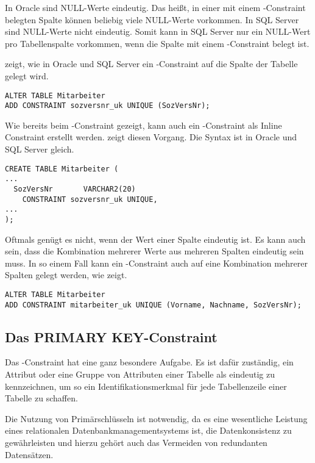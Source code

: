 \begin{merke}
    In Oracle sind NULL-Werte eindeutig. Das heißt, in einer mit einem
    \UNIQUE-Constraint belegten Spalte können beliebig viele NULL-Werte
    vorkommen. In SQL Server sind NULL-Werte nicht eindeutig. Somit kann
    in SQL Server nur ein NULL-Wert pro Tabellenspalte vorkommen, wenn
    die Spalte mit einem \UNIQUE-Constraint belegt ist.
\end{merke}
 zeigt, wie in Oracle und SQL Server ein
\UNIQUE-Constraint auf die Spalte  der Tabelle
 gelegt wird.
\clearpage
\begin{lstlisting}[language=oracle_sql,caption={Ein UNIQUE-Constraint anlegen},label=sql09_10]
ALTER TABLE Mitarbeiter
ADD CONSTRAINT sozversnr_uk UNIQUE (SozVersNr);
        \end{lstlisting}
Wie bereits beim \CHECK-Constraint gezeigt, kann auch ein \UNIQUE-Constraint als Inline Constraint erstellt werden.  zeigt diesen Vorgang. Die Syntax ist in Oracle und SQL Server gleich.
\begin{lstlisting}[language=oracle_sql,caption={Ein \UNIQUE-Constraint als Inline Constraint anlegen},label=sql09_11]
CREATE TABLE Mitarbeiter (
...
  SozVersNr       VARCHAR2(20)
    CONSTRAINT sozversnr_uk UNIQUE,
...
);
        \end{lstlisting}
Oftmals genügt es nicht, wenn der Wert einer Spalte eindeutig ist. Es kann auch sein, dass die Kombination mehrerer Werte aus mehreren Spalten eindeutig sein muss. In so einem Fall kann ein \UNIQUE-Constraint auch auf eine Kombination mehrerer Spalten gelegt werden, wie  zeigt.
\begin{lstlisting}[language=oracle_sql,caption={Ein kombiniertes UNIQUE-Constraint anlegen},label=sql09_12]
ALTER TABLE Mitarbeiter
ADD CONSTRAINT mitarbeiter_uk UNIQUE (Vorname, Nachname, SozVersNr);
        \end{lstlisting}
\subsection{Das PRIMARY KEY-Constraint}
Das \PRIMARYKEY-Constraint hat eine ganz besondere Aufgabe. Es ist dafür zuständig, ein Attribut oder eine Gruppe von Attributen einer Tabelle als eindeutig zu kennzeichnen, um so ein Identifikationsmerkmal für jede Tabellenzeile einer Tabelle zu schaffen.

Die Nutzung von Primärschlüsseln ist notwendig, da es eine wesentliche Leistung eines relationalen Datenbankmanagementsystems ist, die Datenkonsistenz zu gewährleisten und hierzu gehört auch das Vermeiden von redundanten Datensätzen.


